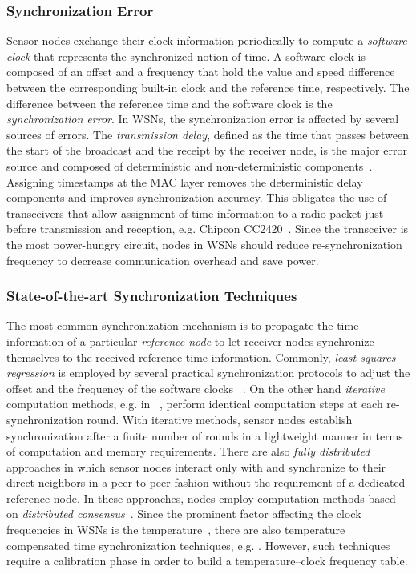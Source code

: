 \documentclass[10pt,journal,compsoc]{IEEEtran}
\begin{document}
\subsubsection{Synchronization Error}

Sensor nodes exchange their clock information periodically to compute a \emph{software clock} that represents the synchronized notion of time. A software clock is composed of an offset and a frequency that hold the value and speed difference between the corresponding built-in clock and the reference time, respectively. The difference between the reference time and the software clock is the \emph{synchronization error}. In WSNs, the synchronization error is affected by several sources of errors. The \emph{transmission delay}, defined as the time that passes between the start of the broadcast and the receipt by the receiver node, is the major error source and composed of deterministic and non-deterministic components~\cite{Maroti2004}. Assigning timestamps at the MAC layer removes the deterministic delay components and improves synchronization accuracy. This obligates the use of transceivers that allow assignment of time information to a radio packet just before transmission and reception, e.g. Chipcon CC2420~\cite{chipcon:cc2420}. Since the transceiver is the most power-hungry circuit, nodes in WSNs should reduce re-synchronization frequency to decrease communication overhead and save power.

\subsubsection{State-of-the-art Synchronization Techniques}

The most common synchronization mechanism is to propagate the time information of a particular \emph{reference node} to let receiver nodes synchronize themselves to the received reference time information. Commonly, \emph{least-squares regression} is employed by several practical synchronization protocols to adjust the offset and the frequency of the software clocks ~\cite{Maroti2004,Lenzen:2015,TATS:2016}. On the other hand \emph{iterative} computation methods, e.g. in ~\cite{Yildirim:AVTS:2014,pi2015,yildirim2017adaptive,Yildirim:Gradient:2016}, perform identical computation steps at each re-synchronization round. With iterative methods, sensor nodes establish synchronization after a finite number of rounds in a lightweight manner in terms of computation and memory requirements. There are also \emph{fully distributed} approaches in which sensor nodes interact only with and synchronize to their direct neighbors in a peer-to-peer fashion without the requirement of a dedicated reference node. In these approaches, nodes employ computation methods based on \emph{distributed consensus}~\cite{Sommer2009Gradient,SchenatoFiorentin:2011,Yildirim:External:2014}. Since the prominent factor affecting the clock frequencies in WSNs is the temperature~\cite{schmid2010case}, there are also temperature compensated time synchronization techniques, e.g. \cite{Schmid:2009}. However, such techniques require a calibration phase in order to build a temperature--clock frequency table.
\end{document}
